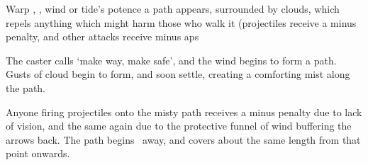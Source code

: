   {\mAir}%
  {Warp}%
  {\detailed, \distant, \duplicated}%
  {wind or tide's potence}%
  {a path appears, surrounded by clouds, which repels anything which might harm those who walk it (projectiles receive a minus  penalty, and other attacks receive minus  \glspl{ap}}%
  {
    The caster calls `make way, make safe', and the wind begins to form a path.
    Gusts of cloud begin to form, and soon settle, creating a comforting mist along the path.

    Anyone firing projectiles onto the misty path receives a minus  penalty due to lack of vision, and the same again due to the protective funnel of wind buffering the arrows back.
    The path begins \spellRange\ away, and covers about the same length from that point onwards.
}

